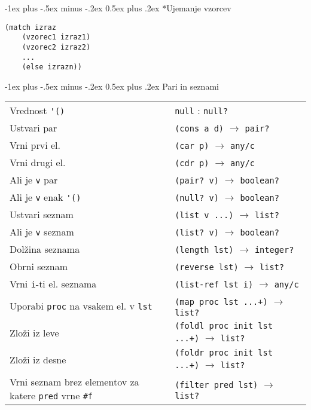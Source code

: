 \documentclass[a3paper,10pt]{extarticle}
\makeatletter
\renewcommand{\section}{\@startsection{section}{1}{0mm}%
                                {-1ex plus -.5ex minus -.2ex}%
                                {0.5ex plus .2ex}%
                                {\normalfont\large\bfseries}}
\makeatother
\begin{document}
\begin{multicols}{4}
\section*{Ujemanje vzorcev}
\begin{lstlisting}
(match izraz
    (vzorec1 izraz1)
    (vzorec2 izraz2)
    ...
    (else izrazn))
\end{lstlisting}

\section{Pari in seznami}

\begin{tabular}{@{}p{3.2cm}l@{}}
    Vrednost \lstinline|'()| & \lstinline|null| : \lstinline|null?|\\
    Ustvari par & \lstinline|(cons a d)| $\rightarrow$ \lstinline|pair?|\\
    Vrni prvi el. & \lstinline|(car p)| $\rightarrow$ \lstinline|any/c|\\
    Vrni drugi el. & \lstinline|(cdr p)| $\rightarrow$ \lstinline|any/c|\\
    Ali je \lstinline|v| par & \lstinline|(pair? v)| $\rightarrow$ \lstinline|boolean?|\\
    Ali je \lstinline|v| enak \lstinline|'()| & \lstinline|(null? v)| $\rightarrow$ \lstinline|boolean?|\\
    Ustvari seznam & \lstinline|(list v ...)| $\rightarrow$ \lstinline|list?|\\
    Ali je \lstinline|v| seznam & \lstinline|(list? v)| $\rightarrow$ \lstinline|boolean?|\\
    Dolžina seznama & \lstinline|(length lst)| $\rightarrow$ \lstinline|integer?|\\
    Obrni seznam & \lstinline|(reverse lst)| $\rightarrow$ \lstinline|list?|\\
    Vrni \lstinline|i|-ti el. seznama & \lstinline|(list-ref lst i)| $\rightarrow$ \lstinline|any/c|\\
    Uporabi \lstinline|proc| na vsakem el. v \lstinline|lst| & \lstinline|(map proc lst ...+)| $\rightarrow$ \lstinline|list?|\\
    Zloži iz leve & \lstinline|(foldl proc init lst ...+)| $\rightarrow$ \lstinline|list?|\\
    Zloži iz desne & \lstinline|(foldr proc init lst ...+)| $\rightarrow$ \lstinline|list?|\\
    Vrni seznam brez elementov za katere \lstinline|pred| vrne \lstinline|#f| & \lstinline|(filter pred lst)| $\rightarrow$ \lstinline|list?|\\
\end{tabular}


\end{multicols}
\end{document}
